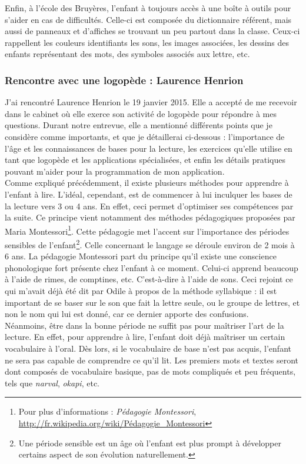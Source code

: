 Enfin, à l'école des Bruyères, l'enfant à toujours accès à une boîte à outils pour s'aider en cas de difficultés. Celle-ci est composée du dictionnaire référent, mais aussi de panneaux et d'affiches se trouvant un peu partout dans la classe. Ceux-ci rappellent les couleurs identifiants les sons, les images associées, les dessins des enfants représentant des mots, des symboles associés aux lettre, etc.

\subsubsection{Rencontre avec une logopède : Laurence Henrion}
J'ai rencontré Laurence Henrion le 19 janvier 2015. Elle a accepté de me recevoir dans le cabinet où elle exerce son activité de logopède pour répondre à mes questions. Durant notre entrevue, elle a mentionné différents points que je considère comme importants, et que je détaillerai ci-dessous : l'importance de l'âge et les connaissances de bases pour la lecture, les exercices qu'elle utilise en tant que logopède et les applications spécialisées, et enfin les détails pratiques pouvant m'aider pour la programmation de mon application.\\

Comme expliqué précédemment, il existe plusieurs méthodes pour apprendre à l'enfant à lire. L'idéal, cependant, est de commencer à lui inculquer les bases de la lecture vers 3 ou 4 ans. En effet, ceci permet d'optimiser ses compétences par la suite. Ce principe vient notamment des méthodes pédagogiques proposées par Maria Montessori\footnote{Pour plus d'informations : \textit{Pédagogie Montessori}, \url{http://fr.wikipedia.org/wiki/Pédagogie_Montessori}}. Cette pédagogie met l'accent sur l'importance des périodes sensibles de l'enfant\footnote{Une période sensible est un âge où l'enfant est plus prompt à développer certains aspect de son évolution naturellement.}. Celle concernant le langage se déroule environ de 2 mois à 6 ans. La pédagogie Montessori part du principe qu'il existe une conscience phonologique fort présente chez l'enfant à ce moment. Celui-ci apprend beaucoup à l'aide de rimes, de comptines, etc. C'est-à-dire à l'aide de sons. Ceci rejoint ce qui m'avait déjà été dit par Odile à propos de la méthode syllabique : il est important de se baser sur le son que fait la lettre seule, ou le groupe de lettres, et non le nom qui lui est donné, car ce dernier apporte des confusions.\\

Néanmoins, être dans la bonne période ne suffit pas pour maîtriser l'art de la lecture. En effet, pour apprendre à lire, l'enfant doit déjà maîtriser un certain vocabulaire à l'oral. Dès lors, si le vocabulaire de base n'est pas acquis, l'enfant ne sera pas capable de comprendre ce qu'il lit. Les premiers mots et textes seront dont composés de vocabulaire basique, pas de mots compliqués et peu fréquents, tels que \textit{narval}, \textit{okapi}, etc.\\

